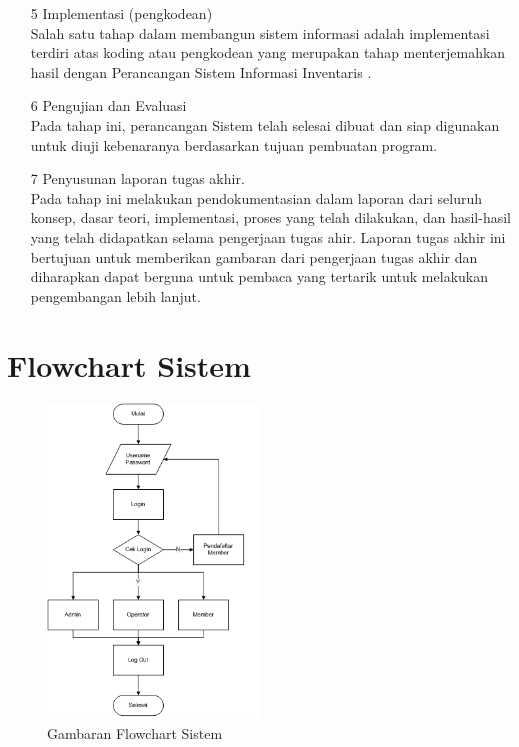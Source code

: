 \documentclass{jtetiproposalskripsi}
\begin{document}
\begin{itemize}
\item[5]Implementasi (pengkodean)
\\
Salah  satu  tahap  dalam  membangun  sistem informasi  adalah  implementasi  terdiri  atas koding atau pengkodean yang merupakan tahap menterjemahkan hasil dengan Perancangan  Sistem  Informasi  Inventaris .
\item[6]Pengujian dan Evaluasi
\\
Pada tahap ini, perancangan Sistem telah selesai dibuat dan siap digunakan untuk diuji kebenaranya berdasarkan tujuan pembuatan program.
\item[7]Penyusunan laporan tugas akhir.
\\
Pada tahap  ini  melakukan  pendokumentasian  dalam laporan  dari  seluruh  konsep, dasar teori, implementasi, proses yang telah dilakukan, dan hasil-hasil yang telah didapatkan selama pengerjaan tugas ahir. Laporan tugas akhir ini bertujuan untuk memberikan gambaran dari pengerjaan tugas akhir dan diharapkan dapat berguna untuk pembaca yang tertarik untuk melakukan pengembangan lebih lanjut.

\end{itemize}

\section{Flowchart Sistem}
\begin{figure}[ht!]
  \centering
    \includegraphics[width=0.5\textwidth]{gambar/flowchart}
    \caption{Gambaran Flowchart Sistem}
    \label{wsn}
\end{figure}
\newpage
\end{document}
